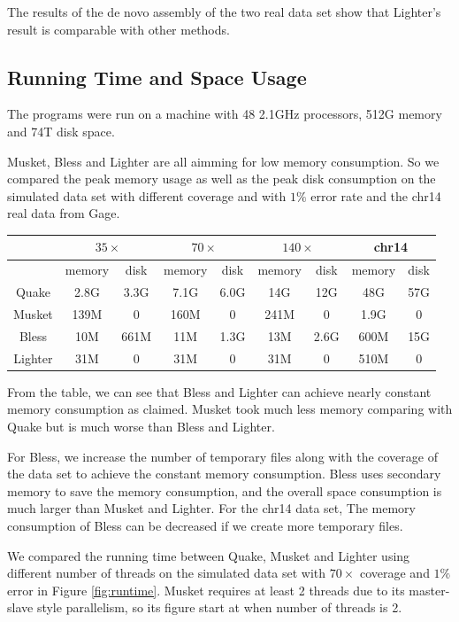 \documentclass[10pt]{article}
\begin{document}
The results of the de novo assembly of the two real data set show that Lighter's result is comparable with other methods.

\subsection*{Running Time and Space Usage}
The programs were run on a machine with 48 2.1GHz processors, 512G memory and 74T disk space. 

Musket, Bless and Lighter are all aimming for low memory consumption. So we compared the peak memory usage as well as the peak disk consumption on the simulated data set with different coverage and with $1\%$ error rate and the chr14 real data from Gage.

\begin{tabular}{|c|c|c||c|c||c|c||c|c|} \hline
		& \multicolumn{2}{|c||}{$35\times$} & \multicolumn{2}{|c||}{$70\times$}  & \multicolumn{2}{|c||}{$140\times$} & \multicolumn{2}{|c|}{chr14}  \\ \hline
		& memory & disk & memory & disk & memory & disk & memory & disk \\ \hline
Quake   & 2.8G	& 3.3G & 7.1G & 6.0G & 14G & 12G & 48G & 57G \\ \hline		
Musket	& 139M	& 0 & 160M & 0 & 241M & 0 & 1.9G & 0 \\ \hline
Bless	& 10M	& 661M & 11M & 1.3G & 13M & 2.6G & 600M & 15G \\ \hline
Lighter	& 31M	& 0 & 31M & 0 & 31M & 0 & 510M & 0 \\ \hline
\end{tabular}

From the table, we can see that Bless and Lighter can achieve nearly constant memory consumption as claimed. Musket took much less memory comparing with Quake but is much worse than Bless and Lighter.

For Bless, we increase the number of temporary files along with the coverage of the data set to achieve the constant memory consumption. Bless uses secondary memory to save the memory consumption, and the overall space consumption is much larger than Musket and Lighter.  For the chr14 data set, The memory consumption of Bless can be decreased if we create more temporary files. 

We compared the running time between Quake, Musket and Lighter using different number of threads on the simulated data set with $70\times$ coverage and $1\%$ error in Figure \ref{fig:runtime}. Musket requires at least 2 threads due to its master-slave style parallelism, so its figure start at when number of threads is 2. 
\end{document}
